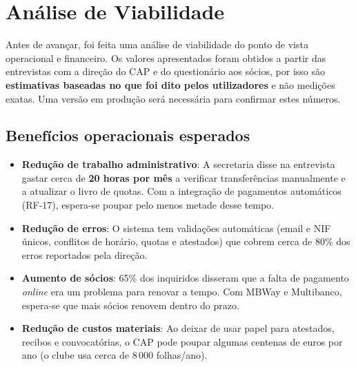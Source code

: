 \section{Análise de Viabilidade}
Antes de avançar, foi feita uma análise de viabilidade do ponto de vista operacional e financeiro. Os valores apresentados foram obtidos a partir das entrevistas com a direção do CAP e do questionário aos sócios, por isso são \textbf{estimativas baseadas no que foi dito pelos utilizadores} e não medições exatas. Uma versão em produção será necessária para confirmar estes números.

\subsection*{Benefícios operacionais esperados}
\begin{itemize}
    \item \textbf{Redução de trabalho administrativo}: A secretaria disse na entrevista gastar cerca de \textbf{20 horas por mês} a verificar transferências manualmente e a atualizar o livro de quotas. Com a integração de pagamentos automáticos (RF-17), espera-se poupar pelo menos metade desse tempo.
    \item \textbf{Redução de erros}: O sistema tem validações automáticas (email e NIF únicos, conflitos de horário, quotas e atestados) que cobrem cerca de 80\% dos erros reportados pela direção.
    \item \textbf{Aumento de sócios}: 65\% dos inquiridos disseram que a falta de pagamento \textit{online} era um problema para renovar a tempo. Com MBWay e Multibanco, espera-se que mais sócios renovem dentro do prazo.
    \item \textbf{Redução de custos materiais}: Ao deixar de usar papel para atestados, recibos e convocatórias, o CAP pode poupar algumas centenas de euros por ano (o clube usa cerca de 8\,000 folhas/ano).
\end{itemize}

